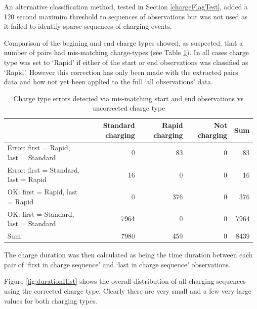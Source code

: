 \documentclass[]{article}
\begin{document}
An alternative classification method, tested in Section \ref{chargeFlagTest}, added a 120 second maximim threshold to sequences of observations but was not used as it failed to identify sparse sequences of charging events.

Comparison of the begining and end charge types showed, as suspected, that a number of pairs had mis-matching charge-types (see Table \ref{tab:checkChargeTypeErrors}). In all cases charge type was set to `Rapid' if either of the start or end observations was classified as `Rapid'. However this correction has only been made with the extracted pairs data and how not yet been applied to the full `all observations' data.

\begin{table}[t]

\caption{\label{tab:checkChargeTypeErrors}Charge type errors detected via mis-matching start and end observations vs uncorrected charge type}
\centering
\begin{tabular}{l|r|r|r|r}
\hline
  & Standard charging & Rapid charging & Not charging & Sum\\
\hline
Error: first = Rapid, last = Standard & 0 & 83 & 0 & 83\\
\hline
Error: first = Standard, last = Rapid & 16 & 0 & 0 & 16\\
\hline
OK: first = Rapid, last = Rapid & 0 & 376 & 0 & 376\\
\hline
OK: first = Standard, last = Standard & 7964 & 0 & 0 & 7964\\
\hline
Sum & 7980 & 459 & 0 & 8439\\
\hline
\end{tabular}
\end{table}

The charge duration was then calculated as being the time duration between each pair of `first in charge sequence' and `last in charge sequence' observations.

Figure \ref{fig:durationHist} shows the overall distribution of all charging sequences using the corrected charge type. Clearly there are very small and a few very large values for both charging types.
\end{document}

